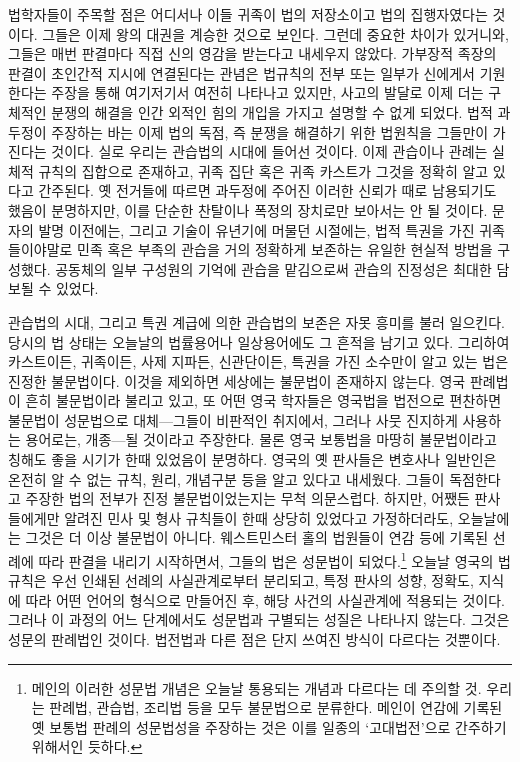법학자들이 주목할 점은
어디서나 이들 귀족이 법의 저장소이고 법의 집행자였다는 것이다.
그들은 이제 왕의 대권을 계승한 것으로 보인다.
그런데 중요한 차이가 있거니와,
그들은 매번 판결마다 직접 신의 영감을 받는다고 내세우지 않았다.
가부장적 족장의 판결이 초인간적 지시에 연결된다는 관념은
법규칙의 전부 또는 일부가 신에게서 기원한다는 주장을 통해 여기저기서 여전히
나타나고 있지만,
사고의 발달로 이제 더는 구체적인 분쟁의 해결을
인간 외적인 힘의 개입을 가지고 설명할 수 없게 되었다.
법적 과두정이 주장하는 바는 이제 법의 독점, 즉
분쟁을 해결하기 위한 법원칙을 그들만이 가진다는 것이다.
실로 우리는 관습법의 시대에 들어선 것이다.
이제 관습이나 관례는 실체적 규칙의 집합으로 존재하고,
귀족 집단 혹은 귀족 카스트가 그것을 정확히 알고 있다고 간주된다.
옛 전거들에 따르면 과두정에 주어진 이러한 신뢰가
때로 남용되기도 했음이 분명하지만,
이를 단순한 찬탈이나 폭정의 장치로만 보아서는 안 될 것이다.
문자의 발명 이전에는, 그리고 기술이 유년기에 머물던 시절에는,
법적 특권을 가진 귀족들이야말로 민족 혹은 부족의 관습을
거의 정확하게 보존하는 유일한 현실적 방법을 구성했다.
공동체의 일부 구성원의 기억에 관습을 맡김으로써
관습의 진정성은 최대한 담보될 수 있었다.

관습법의 시대, 그리고 특권 계급에 의한 관습법의 보존은
자못 흥미를 불러 일으킨다.
당시의 법 상태는 오늘날의 법률용어나 일상용어에도 그 흔적을 남기고 있다.
그리하여
카스트이든, 귀족이든, 사제 지파든, 신관단이든,
특권을 가진 소수만이 알고 있는 법은 진정한 불문법이다.
이것을 제외하면 세상에는 불문법이 존재하지 않는다.
영국 판례법이 흔히 불문법이라 불리고 있고, 또 어떤 영국 학자들은
영국법을 법전으로 편찬하면 불문법이 성문법으로
대체---그들이 비판적인 취지에서, 그러나 사뭇 진지하게 사용하는 용어로는,
개종---될 것이라고 주장한다.
물론 영국 보통법을 마땅히 불문법이라고 칭해도 좋을 시기가 한때 있었음이
분명하다.
영국의 옛 판사들은 변호사나 일반인은 온전히 알 수 없는
규칙, 원리, 개념구분 등을 알고 있다고 내세웠다.
그들이 독점한다고 주장한 법의 전부가 진정 불문법이었는지는 무척 의문스럽다.
하지만, 어쨌든 판사들에게만 알려진 민사 및 형사 규칙들이 한때 상당히 있었다고
가정하더라도, 오늘날에는 그것은 더 이상 불문법이 아니다.
웨스트민스터 홀의 법원들이
연감 등에 기록된 선례에 따라 판결을 내리기 시작하면서,
그들의 법은 성문법이 되었다.\footnote{메인의 이러한 성문법 개념은
오늘날 통용되는 개념과 다르다는 데 주의할 것. 우리는 판례법, 관습법,
조리법 등을 모두 불문법으로 분류한다.
메인이 연감에 기록된 옛 보통법 판례의 성문법성을 주장하는 것은
이를 일종의 `고대법전'으로 간주하기 위해서인 듯하다.}
오늘날 영국의 법규칙은 우선 인쇄된 선례의 사실관계로부터 분리되고,
특정 판사의 성향, 정확도, 지식에 따라 어떤 언어의 형식으로 만들어진 후,
해당 사건의 사실관계에 적용되는 것이다.
그러나 이 과정의 어느 단계에서도 성문법과 구별되는 성질은 나타나지 않는다.
그것은 성문의 판례법인 것이다.
법전법과 다른 점은 단지 쓰여진 방식이 다르다는 것뿐이다.

